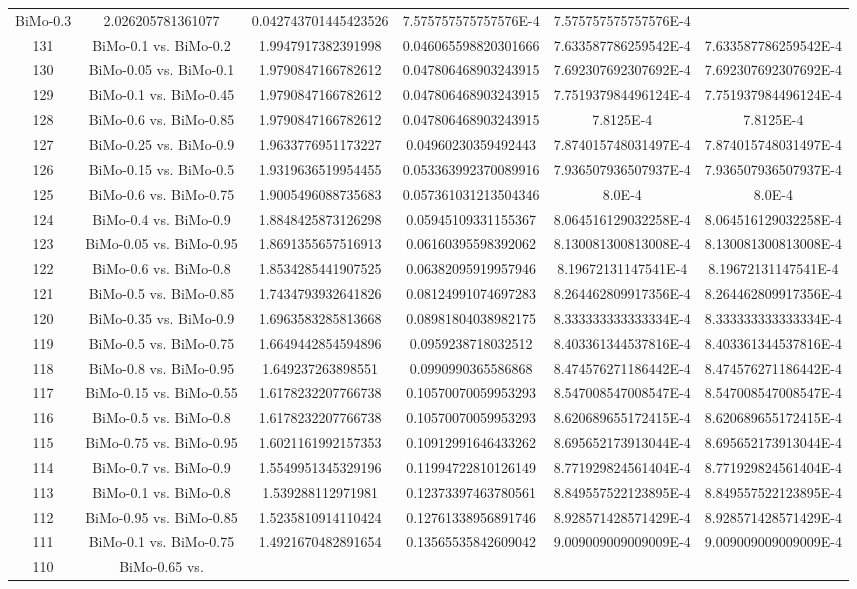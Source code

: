 \documentclass[a4paper,10pt]{article}
\begin{document}
\begin{landscape}
\begin{table}[!htp]
\begin{tabular}{cccccc}
BiMo-0.3&2.026205781361077&0.042743701445423526&7.575757575757576E-4&7.575757575757576E-4\\131&BiMo-0.1 vs. BiMo-0.2&1.9947917382391998&0.046065598820301666&7.633587786259542E-4&7.633587786259542E-4\\130&BiMo-0.05 vs. BiMo-0.1&1.9790847166782612&0.047806468903243915&7.692307692307692E-4&7.692307692307692E-4\\129&BiMo-0.1 vs. BiMo-0.45&1.9790847166782612&0.047806468903243915&7.751937984496124E-4&7.751937984496124E-4\\128&BiMo-0.6 vs. BiMo-0.85&1.9790847166782612&0.047806468903243915&7.8125E-4&7.8125E-4\\127&BiMo-0.25 vs. BiMo-0.9&1.9633776951173227&0.04960230359492443&7.874015748031497E-4&7.874015748031497E-4\\126&BiMo-0.15 vs. BiMo-0.5&1.9319636519954455&0.053363992370089916&7.936507936507937E-4&7.936507936507937E-4\\125&BiMo-0.6 vs. BiMo-0.75&1.9005496088735683&0.057361031213504346&8.0E-4&8.0E-4\\124&BiMo-0.4 vs. BiMo-0.9&1.8848425873126298&0.05945109331155367&8.064516129032258E-4&8.064516129032258E-4\\123&BiMo-0.05 vs. BiMo-0.95&1.8691355657516913&0.06160395598392062&8.130081300813008E-4&8.130081300813008E-4\\122&BiMo-0.6 vs. BiMo-0.8&1.8534285441907525&0.06382095919957946&8.19672131147541E-4&8.19672131147541E-4\\121&BiMo-0.5 vs. BiMo-0.85&1.7434793932641826&0.08124991074697283&8.264462809917356E-4&8.264462809917356E-4\\120&BiMo-0.35 vs. BiMo-0.9&1.6963583285813668&0.08981804038982175&8.333333333333334E-4&8.333333333333334E-4\\119&BiMo-0.5 vs. BiMo-0.75&1.6649442854594896&0.0959238718032512&8.403361344537816E-4&8.403361344537816E-4\\118&BiMo-0.8 vs. BiMo-0.95&1.649237263898551&0.0990990365586868&8.474576271186442E-4&8.474576271186442E-4\\117&BiMo-0.15 vs. BiMo-0.55&1.6178232207766738&0.10570070059953293&8.547008547008547E-4&8.547008547008547E-4\\116&BiMo-0.5 vs. BiMo-0.8&1.6178232207766738&0.10570070059953293&8.620689655172415E-4&8.620689655172415E-4\\115&BiMo-0.75 vs. BiMo-0.95&1.6021161992157353&0.10912991646433262&8.695652173913044E-4&8.695652173913044E-4\\114&BiMo-0.7 vs. BiMo-0.9&1.5549951345329196&0.11994722810126149&8.771929824561404E-4&8.771929824561404E-4\\113&BiMo-0.1 vs. BiMo-0.8&1.539288112971981&0.12373397463780561&8.849557522123895E-4&8.849557522123895E-4\\112&BiMo-0.95 vs. BiMo-0.85&1.5235810914110424&0.12761338956891746&8.928571428571429E-4&8.928571428571429E-4\\111&BiMo-0.1 vs. BiMo-0.75&1.4921670482891654&0.13565535842609042&9.009009009009009E-4&9.009009009009009E-4\\110&BiMo-0.65 vs. 
\end{tabular}
\end{table}
\end{landscape}
\end{document}
